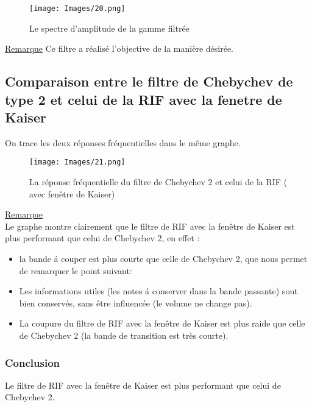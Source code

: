 \documentclass[twoside,twocolumn]{article}
\begin{document}
\begin{figure}[H]
\centering
\texttt{[image: Images/20.png]}
\caption{ Le spectre d'amplitude de la gamme filtrée}
\end{figure}

\underline{Remarque}
Ce filtre a réalisé l'objective de la manière désirée.

\subsection{Comparaison entre le filtre de Chebychev de type 2 et celui de la RIF avec la fenetre de Kaiser}
On trace les deux réponses fréquentielles dans le même graphe.
 
\begin{figure}[H]
\centering
\texttt{[image: Images/21.png]}
\caption{ La réponse fréquentielle du filtre de Chebychev 2 et celui de la RIF ( avec fenêtre de Kaiser)}
\end{figure} 

\underline{Remarque}\\
Le graphe montre clairement que le filtre de RIF avec la fenêtre de Kaiser est plus performant que celui de Chebychev 2, en effet :
\begin{itemize}
\item
la bande á couper est plus courte que celle de Chebychev 2, que nous permet de remarquer le point suivant:
\item
Les informations utiles (les notes á conserver dans la bande passante) sont bien conservés, sans être influencée (le volume ne change pas).
\item
La coupure du filtre de RIF avec la fenêtre de Kaiser est plus raide que celle de Chebychev 2 (la bande de transition est très courte).
\end{itemize}

\subsubsection{Conclusion}
Le filtre de RIF avec la fenêtre de Kaiser est plus performant que celui de Chebychev 2.
\end{document}
